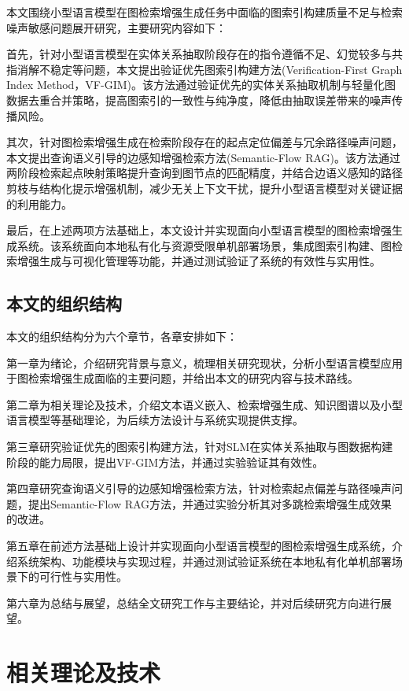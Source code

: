 \documentclass[promaster, vlined]{DissertUESTC}
\begin{document}
本文围绕小型语言模型在图检索增强生成任务中面临的图索引构建质量不足与检索噪声敏感问题展开研究，主要研究内容如下：

首先，针对小型语言模型在实体关系抽取阶段存在的指令遵循不足、幻觉较多与共指消解不稳定等问题，本文提出验证优先图索引构建方法(Verification-First Graph Index Method，VF-GIM)。该方法通过验证优先的实体关系抽取机制与轻量化图数据去重合并策略，提高图索引的一致性与纯净度，降低由抽取误差带来的噪声传播风险。

其次，针对图检索增强生成在检索阶段存在的起点定位偏差与冗余路径噪声问题，本文提出查询语义引导的边感知增强检索方法(Semantic-Flow RAG)。该方法通过两阶段检索起点映射策略提升查询到图节点的匹配精度，并结合边语义感知的路径剪枝与结构化提示增强机制，减少无关上下文干扰，提升小型语言模型对关键证据的利用能力。

最后，在上述两项方法基础上，本文设计并实现面向小型语言模型的图检索增强生成系统。该系统面向本地私有化与资源受限单机部署场景，集成图索引构建、图检索增强生成与可视化管理等功能，并通过测试验证了系统的有效性与实用性。


\section{本文的组织结构}

本文的组织结构分为六个章节，各章安排如下：

第一章为绪论，介绍研究背景与意义，梳理相关研究现状，分析小型语言模型应用于图检索增强生成面临的主要问题，并给出本文的研究内容与技术路线。

第二章为相关理论及技术，介绍文本语义嵌入、检索增强生成、知识图谱以及小型语言模型等基础理论，为后续方法设计与系统实现提供支撑。

第三章研究验证优先的图索引构建方法，针对SLM在实体关系抽取与图数据构建阶段的能力局限，提出VF-GIM方法，并通过实验验证其有效性。

第四章研究查询语义引导的边感知增强检索方法，针对检索起点偏差与路径噪声问题，提出Semantic-Flow RAG方法，并通过实验分析其对多跳检索增强生成效果的改进。

第五章在前述方法基础上设计并实现面向小型语言模型的图检索增强生成系统，介绍系统架构、功能模块与实现过程，并通过测试验证系统在本地私有化单机部署场景下的可行性与实用性。

第六章为总结与展望，总结全文研究工作与主要结论，并对后续研究方向进行展望。

\chapter{相关理论及技术}
\end{document}
